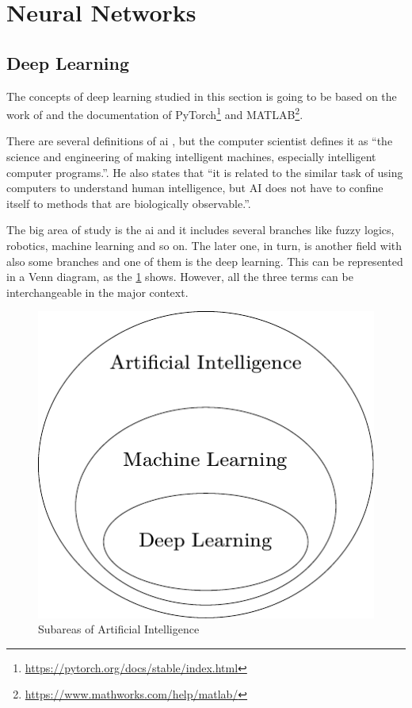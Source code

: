 \section{Neural Networks}

\subsection{Deep Learning}

The concepts of deep learning studied in this section is going to be based on the work of \citet{goodfellow2016} and the documentation of PyTorch\footnote{\url{https://pytorch.org/docs/stable/index.html}} and MATLAB\footnote{\url{https://www.mathworks.com/help/matlab/}}.

There are several definitions of \gls*{ai} \citep{winston1992}, but the  computer scientist \citet{mccarthy2007} defines it as ``the science and engineering of making intelligent machines, especially intelligent computer programs.''.
He also states that ``it is related to the similar task of using computers to understand human intelligence, but AI does not have to confine itself to methods that are biologically observable.''.

The big area of study is the \gls*{ai} and it includes several branches like fuzzy logics, robotics, machine learning and so on. 
The later one, in turn, is another field with also some branches and one of them is the deep learning.
This can be represented in a Venn diagram, as the \cref{fig:venn_dl} shows.
However, all the three terms can be interchangeable in the major context.

\begin{figure}
    \centering
    \includegraphics{figures/2methodology/nn/venn_dl.pdf}
    \caption{Subareas of Artificial Intelligence}
    \label{fig:venn_dl}
\end{figure}

